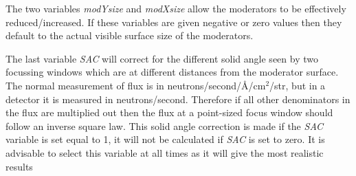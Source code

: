The two variables {\it modYsize} and {\it modXsize}
allow the moderators to be effectively reduced/increased. If
these variables are given  negative or zero values then they default to the actual
visible surface size of the moderators.

The last variable {\it SAC} will correct for the different solid angle seen by two
focussing windows which are at different distances from the moderator surface. The
normal measurement of flux is in neutrons/second/\AA/cm{$^2$}/str, but in a detector
it is measured in neutrons/second. Therefore if all other denominators in the flux are
multiplied out then the flux at a point-sized focus window should follow an inverse square law.
This solid angle correction is made if the {\it SAC} variable is set equal to 1, it will not be
calculated if {\it SAC} is set to zero. It is advisable to select this variable at all times as it will give the most realistic results

